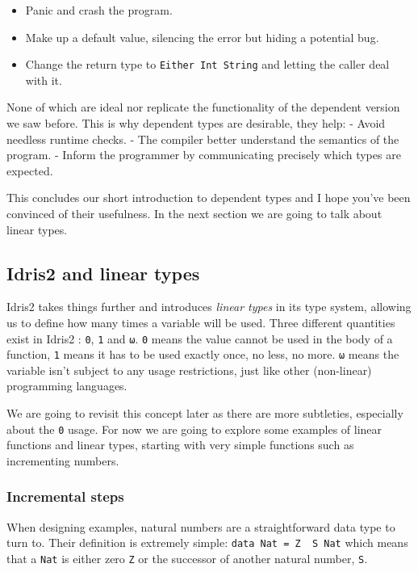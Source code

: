 \documentclass[
]{article}
\providecommand{\tightlist}{%
  \setlength{\itemsep}{0pt}\setlength{\parskip}{0pt}}
\begin{document}
\begin{itemize}
\tightlist
\item
  Panic and crash the program.
\item
  Make up a default value, silencing the error but hiding a potential
  bug.
\item
  Change the return type to \texttt{Either\ Int\ String} and letting the
  caller deal with it.
\end{itemize}

None of which are ideal nor replicate the functionality of the dependent
version we saw before. This is why dependent types are desirable, they
help: - Avoid needless runtime checks. - The compiler better understand
the semantics of the program. - Inform the programmer by communicating
precisely which types are expected.

This concludes our short introduction to dependent types and I hope
you've been convinced of their usefulness. In the next section we are
going to talk about linear types.

\hypertarget{idris2-and-linear-types}{%
\subsection{Idris2 and linear types}\label{idris2-and-linear-types}}

Idris2 takes things further and introduces \emph{linear types} in its
type system, allowing us to define how many times a variable will be
used. Three different quantities exist in Idris2 : \texttt{0},
\texttt{1} and \texttt{ω}. \texttt{0} means the value cannot be used in
the body of a function, \texttt{1} means it has to be used exactly once,
no less, no more. \texttt{ω} means the variable isn't subject to any
usage restrictions, just like other (non-linear) programming languages.

We are going to revisit this concept later as there are more subtleties,
especially about the \texttt{0} usage. For now we are going to explore
some examples of linear functions and linear types, starting with very
simple functions such as incrementing numbers.

\hypertarget{incremental-steps}{%
\subsubsection{Incremental steps}\label{incremental-steps}}

When designing examples, natural numbers are a straightforward data type
to turn to. Their definition is extremely simple:
\texttt{data\ Nat\ =\ Z\ \textbar{}\ S\ Nat} which means that a
\texttt{Nat} is either zero \texttt{Z} or the successor of another
natural number, \texttt{S}.
\end{document}
